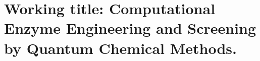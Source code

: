 \chapter[Working title: Computational Enzyme Engineering and Screening by Quantum Chemical Methods.]
{Working title: Computational Enzyme Engineering and Screening by Quantum Chemical Methods.\label{ch1}}


